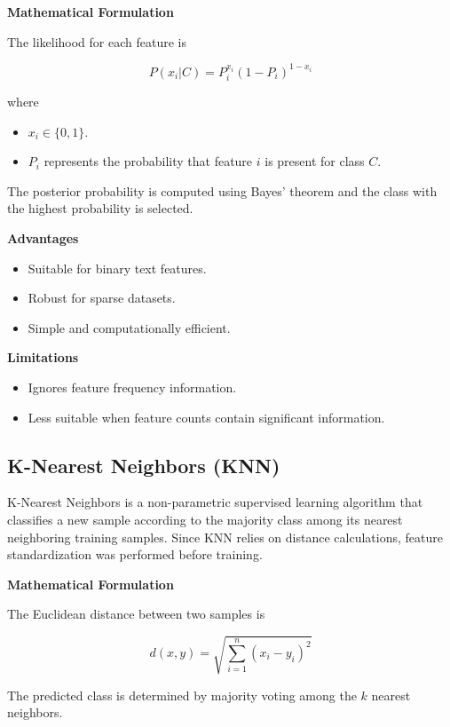 \documentclass[12pt,a4paper]{article}
\begin{document}
	\textbf{Mathematical Formulation}
	
	The likelihood for each feature is
	
	\[
	P(x_i|C)=
	P_i^{x_i}
	(1-P_i)^{1-x_i}
	\]
	
	where
	
	\begin{itemize}
		\item $x_i \in \{0,1\}$.
		\item $P_i$ represents the probability that feature $i$ is present for class $C$.
	\end{itemize}
	
	The posterior probability is computed using Bayes' theorem and the class with the highest probability is selected.
	
	\textbf{Advantages}
	
	\begin{itemize}
		\item Suitable for binary text features.
		\item Robust for sparse datasets.
		\item Simple and computationally efficient.
	\end{itemize}
	
	\textbf{Limitations}
	
	\begin{itemize}
		\item Ignores feature frequency information.
		\item Less suitable when feature counts contain significant information.
	\end{itemize}
	
	\subsection{K-Nearest Neighbors (KNN)}
	
	K-Nearest Neighbors is a non-parametric supervised learning algorithm that classifies a new sample according to the majority class among its nearest neighboring training samples. Since KNN relies on distance calculations, feature standardization was performed before training.
	
	\textbf{Mathematical Formulation}
	
	The Euclidean distance between two samples is
	
	\[
	d(x,y)
	=
	\sqrt{
		\sum_{i=1}^{n}
		(x_i-y_i)^2
	}
	\]
	
	The predicted class is determined by majority voting among the $k$ nearest neighbors.
	
\end{document}
